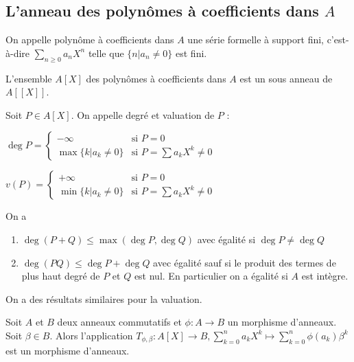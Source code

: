\subsection{L'anneau des polynômes à coefficients dans $A$}

\begin{de}
On appelle polynôme à coefficients dans $A$ une série formelle à support fini, c'est-à-dire $\sum_{n \geq 0} a_n X^n$ telle que $\{n | a_n \neq 0\}$ est fini.
\end{de}

\begin{prop}
L'ensemble $A[X]$ des polynômes à coefficients dans $A$ est un sous anneau de $A[[X]]$.
\end{prop}

\begin{de}
Soit $P \in A[X]$. On appelle degré et valuation de $P$ :

$\deg P = \begin{cases} 
-\infty & \text{si } P = 0 \\
\max\{k | a_k \neq 0\} & \text{si } P = \sum a_k X^k \neq 0 
\end{cases}$

$v(P) = \begin{cases}
+\infty & \text{si } P = 0 \\
\min\{k | a_k \neq 0\} & \text{si } P = \sum a_k X^k \neq 0
\end{cases}$
\end{de}

\begin{prop}
On a 
\begin{enumerate}
\item $\deg(P + Q) \leq \max(\deg P, \deg Q)$ avec égalité si $\deg P \neq \deg Q$ 
\item $\deg(PQ) \leq \deg P + \deg Q$ avec égalité sauf si le produit des termes de plus haut degré de $P$ et $Q$ est nul. En particulier on a égalité si $A$ est intègre.
\end{enumerate}
\end{prop}

\begin{rem}
On a des résultats similaires pour la valuation.
\end{rem}

\begin{prop}
Soit $A$ et $B$ deux anneaux commutatifs et $\phi:A \rightarrow B$ un morphisme d'anneaux. Soit $\beta \in B$. Alors l'application $T_{\phi,\beta}:A[X] \rightarrow B, \sum_{k=0}^n a_k X^k \mapsto \sum_{k=0}^n \phi(a_k) \beta^k$ est un morphisme d'anneaux.
\end{prop}

